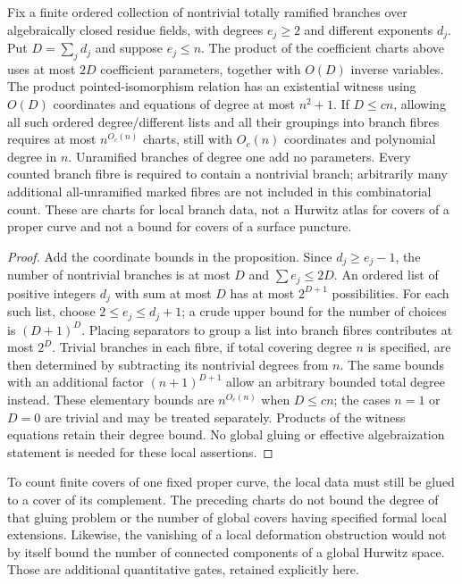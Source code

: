 \begin{corollary}
\label{D:local-branch-data-linear-complexity}
Fix a finite ordered collection of nontrivial totally ramified branches
over algebraically closed residue fields, with degrees $e_j\ge2$ and
different exponents $d_j$. Put $D=\sum_jd_j$ and suppose $e_j\le n$.
The product of the coefficient charts above uses at most $2D$
coefficient parameters, together with $O(D)$ inverse variables.
The product pointed-isomorphism relation has an existential witness
using $O(D)$ coordinates and equations of degree at most $n^2+1$.
If $D\le cn$, allowing all such ordered degree/different lists and
all their groupings into branch fibres requires at most
$n^{O_c(n)}$ charts, still with $O_c(n)$ coordinates and polynomial
degree in $n$. Unramified branches of degree one add no parameters.
Every counted branch fibre is required to contain a nontrivial branch;
arbitrarily many additional all-unramified marked fibres are not included
in this combinatorial count.
These are charts for local branch data, not a Hurwitz atlas for covers
of a proper curve and not a bound for covers of a surface puncture.
\end{corollary}
\begin{proof}
Add the coordinate bounds in the proposition. Since $d_j\ge e_j-1$,
the number of nontrivial branches is at most $D$ and
$\sum e_j\le2D$. An ordered list of positive integers $d_j$ with
sum at most $D$ has at most $2^{D+1}$ possibilities. For each such
list, choose $2\le e_j\le d_j+1$; a crude upper bound for the
number of choices is $(D+1)^D$. Placing separators to group a list
into branch fibres contributes at most $2^D$. Trivial branches
in each fibre, if total covering degree $n$ is specified, are
then determined by subtracting its nontrivial degrees from $n$.
The same bounds with an additional factor $(n+1)^{D+1}$ allow an
arbitrary bounded total degree instead. These elementary bounds
are $n^{O_c(n)}$ when $D\le cn$; the cases $n=1$ or $D=0$ are
trivial and may be treated separately. Products of the witness
equations retain their degree bound. No global gluing or effective
algebraization statement is needed for these local assertions.
\end{proof}

\begin{remark}
To count finite covers of one fixed proper curve, the local data must
still be glued to a cover of its complement. The preceding charts
do not bound the degree of that gluing problem or the number of
global covers having specified formal local extensions. Likewise,
the vanishing of a local deformation obstruction would not by
itself bound the number of connected components of a global
Hurwitz space. Those are additional quantitative gates, retained
explicitly here.
\end{remark}
